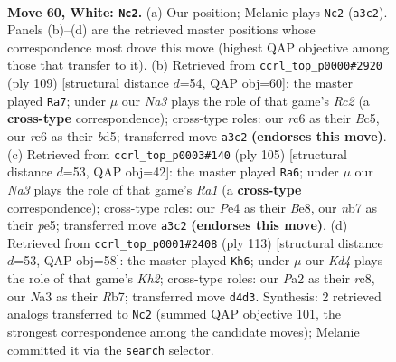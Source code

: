\documentclass[11pt]{article}
\begin{document}
\clearpage

\begin{figure}[p]\centering
\begin{subfigure}{0.46\textwidth}\centering
\resizebox{\linewidth}{!}{%
\newchessgame
\chessboard[
  setfen={7r/pn6/1pr1p1k1/7p/2PKPB2/N5P1/P4R2/1R6 w - - 2 60},
  showmover=false,
  pgfstyle=straightmove, color=movearrow, markmove={a3-c2}
]}
\caption{}
\end{subfigure}\hfill
\begin{subfigure}{0.46\textwidth}\centering
\resizebox{\linewidth}{!}{%
\newchessgame
\chessboard[
  setfen={1r6/2r2pk1/3p2p1/p1bB2P1/4RP2/PP1R4/1K6/8 b - - 37 55},
  showmover=false,
  pgfstyle=straightmove, color=movearrow, markmove={c7-a7}
]}
\caption{}
\end{subfigure}
\\[4pt]
\begin{subfigure}{0.46\textwidth}\centering
\resizebox{\linewidth}{!}{%
\newchessgame
\chessboard[
  setfen={r1r1bk2/1R3p2/4p1p1/4P1P1/p1P4P/N1K5/4R3/8 b - - 30 53},
  showmover=false,
  pgfstyle=straightmove, color=movearrow, markmove={a8-a6}
]}
\caption{}
\end{subfigure}\hfill
\begin{subfigure}{0.46\textwidth}\centering
\resizebox{\linewidth}{!}{%
\newchessgame
\chessboard[
  setfen={2R5/1r4pk/1r3p2/4pn1p/7P/1P4P1/1R1N1PK1/8 b - - 56 57},
  showmover=false,
  pgfstyle=straightmove, color=movearrow, markmove={h7-h6}
]}
\caption{}
\end{subfigure}
\caption{\textbf{Move 60, White: \texttt{Nc2}.} (a) Our position; Melanie plays \texttt{Nc2} (\texttt{a3c2}). Panels (b)--(d) are the retrieved master positions whose correspondence most drove this move (highest QAP objective among those that transfer to it). (b) Retrieved from \texttt{ccrl\_top\_p0000\#2920} (ply 109) [structural distance $d$=54, QAP obj=60]: the master played \texttt{Ra7}; under $\mu$ our \emph{Na3} plays the role of that game's \emph{Rc2} (a \textbf{cross-type} correspondence); cross-type roles: our \emph{r}c6 as their \emph{B}c5, our \emph{r}c6 as their \emph{b}d5; transferred move \texttt{a3c2} \textbf{(endorses this move)}. (c) Retrieved from \texttt{ccrl\_top\_p0003\#140} (ply 105) [structural distance $d$=53, QAP obj=42]: the master played \texttt{Ra6}; under $\mu$ our \emph{Na3} plays the role of that game's \emph{Ra1} (a \textbf{cross-type} correspondence); cross-type roles: our \emph{P}e4 as their \emph{B}e8, our \emph{n}b7 as their \emph{p}e5; transferred move \texttt{a3c2} \textbf{(endorses this move)}. (d) Retrieved from \texttt{ccrl\_top\_p0001\#2408} (ply 113) [structural distance $d$=53, QAP obj=58]: the master played \texttt{Kh6}; under $\mu$ our \emph{Kd4} plays the role of that game's \emph{Kh2}; cross-type roles: our \emph{P}a2 as their \emph{r}c8, our \emph{N}a3 as their \emph{R}b7; transferred move \texttt{d4d3}. Synthesis: 2 retrieved analogs transferred to \texttt{Nc2} (summed QAP objective 101, the strongest correspondence among the candidate moves); Melanie committed it via the \texttt{search} selector.}
\label{fig:thought-m118}
\end{figure}
\end{document}
